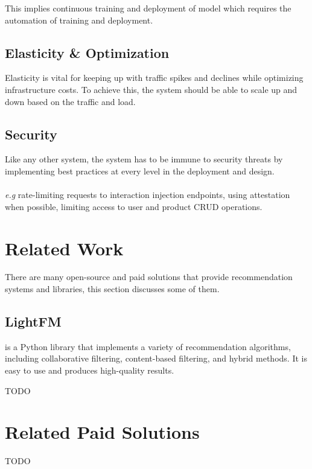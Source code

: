 This implies continuous training and deployment of model which requires the automation of training and deployment.

\subsection{Elasticity \& Optimization}

Elasticity is vital for keeping up with traffic spikes and declines while optimizing infrastructure costs. To achieve this, the system should be able to scale up and down based on the traffic and load.

\subsection{Security}

Like any other system, the system has to be immune to security threats by implementing best practices at every level in the deployment and design. \\ \\
\textit{e.g} rate-limiting requests to interaction injection endpoints, using attestation when possible, limiting access to user and product CRUD operations.

\section{Related Work}

There are many open-source and paid solutions that provide recommendation systems and libraries, this section discusses some of them.

\subsection{LightFM  }
is a Python library that implements a variety of recommendation algorithms, including collaborative filtering, content-based filtering, and hybrid methods. It is easy to use and produces high-quality results.


TODO

\section{Related Paid Solutions}

TODO